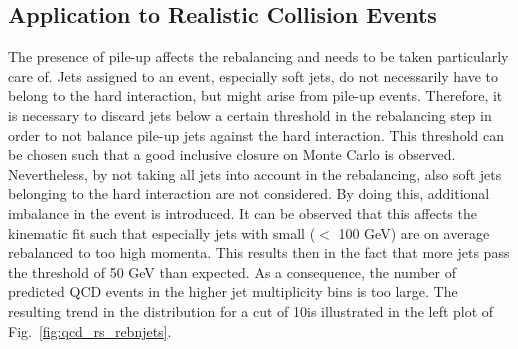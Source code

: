 \subsection{Application to Realistic Collision Events}
\label{subsec:RPlusS_app} 
The presence of pile-up affects the rebalancing and needs to be taken particularly care of. Jets assigned to an event, especially soft jets, do not necessarily have to belong to the hard interaction, but might arise from pile-up events. Therefore, it is necessary to discard jets below a certain \pt threshold in the rebalancing step in order to not balance pile-up jets against the hard interaction. This \pt threshold can be chosen such that a good inclusive closure on Monte Carlo is observed. Nevertheless, by not taking all jets into account in the rebalancing, also soft jets belonging to the hard interaction are not considered. By doing this, additional imbalance in the event is introduced. It can be observed that this affects the kinematic fit such that especially jets with small \pt ($<$ 100 GeV) are on average rebalanced to too high momenta. This results then in the fact that more jets pass the threshold of 50 GeV than expected. As a consequence, the number of predicted QCD events in the higher jet multiplicity bins is too large. The resulting trend in the \NJets distribution for a \pt cut of 10\gev is illustrated in the left plot of Fig.~\ref{fig:qcd_rs_rebnjets}.\\


